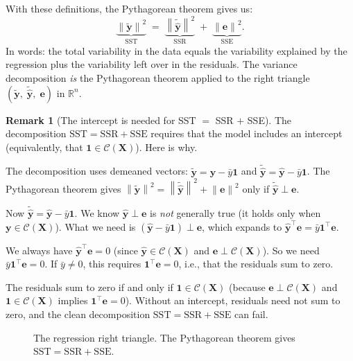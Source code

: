 \documentclass[11pt,a4paper]{article}
\theoremstyle{plain}
\theoremstyle{definition}
\newtheorem{remark}[theorem]{Remark}
\newcommand{\R}{\mathbb{R}}
\newcommand{\yhat}{\hat{\bm{y}}}
\newcommand{\bX}{\bm{X}}
\newcommand{\by}{\bm{y}}
\newcommand{\be}{\bm{e}}
\newcommand{\Col}{\mathcal{C}}
\newcommand{\norm}[1]{\left\lVert #1 \right\rVert}
\begin{document}
\noindent With these definitions, the Pythagorean theorem gives us:
\[
  \boxed{
  \underbrace{\norm{\tilde{\by}}^2}_{\text{SST}}
  \;=\;
  \underbrace{\norm{\tilde{\yhat}}^2}_{\text{SSR}}
  \;+\;
  \underbrace{\norm{\be}^2}_{\text{SSE}}.
  }
\]
In words: the total variability in the data equals the variability explained by the regression plus the variability left over in the residuals.
The variance decomposition \emph{is} the Pythagorean theorem applied to
the right triangle $(\tilde{\by},\;\tilde{\yhat},\;\be)$ in $\R^n$.

\begin{remark}[The intercept is needed for SST $=$ SSR $+$ SSE]\label{rem:intercept-decomp}
The decomposition $\text{SST} = \text{SSR} + \text{SSE}$ requires that the
model includes an intercept (equivalently, that $\bm{1}\in\Col(\bX)$).
Here is why.

The decomposition uses demeaned vectors: $\tilde{\by} = \by - \bar{y}\bm{1}$
and $\tilde{\yhat} = \yhat - \bar{y}\bm{1}$.  The Pythagorean theorem gives
$\norm{\tilde{\by}}^2 = \norm{\tilde{\yhat}}^2 + \norm{\be}^2$
only if $\tilde{\yhat}\perp\be$.

Now $\tilde{\yhat} = \yhat - \bar{y}\bm{1}$.
We know $\yhat\perp\be$ is \emph{not} generally true (it holds only when
$\by\in\Col(\bX)$).
What we need is $(\yhat - \bar{y}\bm{1})\perp\be$, which expands to
$\yhat^\top\be = \bar{y}\bm{1}^\top\be$.

We always have $\yhat^\top\be = 0$ (since $\yhat\in\Col(\bX)$ and
$\be\perp\Col(\bX)$).  So we need $\bar{y}\bm{1}^\top\be = 0$.
If $\bar{y}\ne 0$, this requires $\bm{1}^\top\be = 0$, i.e., that the
residuals sum to zero.

The residuals sum to zero if and only if $\bm{1}\in\Col(\bX)$
(because $\be\perp\Col(\bX)$ and $\bm{1}\in\Col(\bX)$ implies
$\bm{1}^\top\be = 0$).
Without an intercept, residuals need not sum to zero, and the clean
decomposition $\text{SST} = \text{SSR} + \text{SSE}$ can fail.
\end{remark}

\begin{figure}[h]
\centering
{}
\caption{The regression right triangle. The Pythagorean theorem gives
$\text{SST}=\text{SSR}+\text{SSE}$.}
\end{figure}
\end{document}

